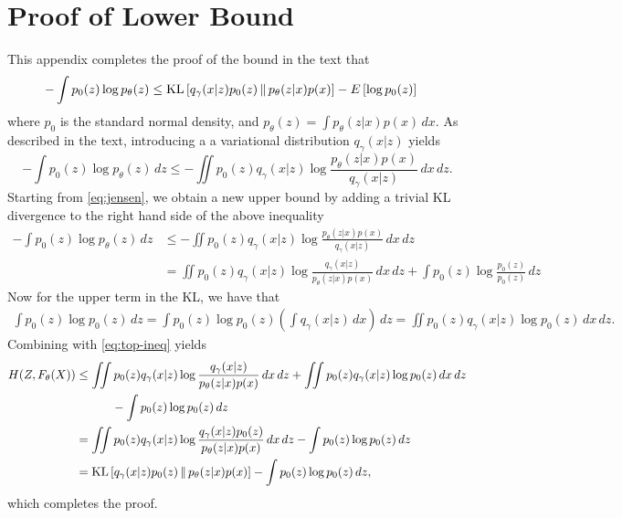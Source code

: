 \appendix
\section{Proof of Lower Bound}

This appendix completes the proof of the bound in the text that
\begin{align}
-\int p_0(z) \log p_\theta(z) 
& \leq \mbox{KL}\left[ q_\gamma(x|z) p_0(z) \,\|\, p_\theta(z|x)p(x) \right]
 - {E}\left[ \log p_0(z) \right]\label{eq:appendix1} 
\end{align}
where $p_0$ is the standard normal density, and $p_\theta(z) = \int p_\theta(z|x) p(x) \,dx$.
As described in the text, introducing a a variational distribution $q_\gamma (x|z)$ yields
\begin{equation}
-\int p_0(z) \log p_\theta(z) \,dz \leq -\iint p_0(z) q_\gamma(x|z) \log \frac{p_\theta(z|x)p(x)}{q_\gamma(x|z)} \,dx \,dz.\label{eq:jensen}
\end{equation}
Starting from \eqref{eq:jensen}, we obtain a new upper bound by adding a trivial KL divergence to the right hand side of the above inequality
\begin{align}
-\int p_0(z) \log p_\theta(z) \,dz
  &\leq -\iint p_0(z) q_\gamma(x|z) \log \frac{p_\theta(z|x)p(x)}{q_\gamma(x|z)} \,dx \,dz \nonumber\\
  &= \iint p_0(z) q_\gamma(x|z) \log \frac{q_\gamma(x|z)}{p_\theta(z|x)p(x)} \,dx \,dz + \int p_0(z) \log \frac{p_0(z)}{p_0(z)} \,dz \label{eq:top-ineq}
\end{align}
Now for the upper term in the KL, we have that
\begin{align*}
	\int p_0(z) \log {p_0(z)} \,dz = \int p_0(z) \log {p_0(z)} \left(\int q_\gamma(x|z) \,dx \right)\,dz 
	 = \iint p_0(z) q_\gamma(x|z) \log {p_0(z)} \,dx \,dz.
\end{align*}
Combining with \eqref{eq:top-ineq} yields
\begin{align} 
H(Z, F_\theta(X)) &\leq \iint p_0(z) q_\gamma(x|z) \log \frac{q_\gamma(x|z)}{p_\theta(z|x)p(x)} \,dx \,dz
        + \iint p_0(z) q_\gamma(x|z) \log {p_0(z)} \,dx \,dz \nonumber\\
        & \qquad\quad - \int p_0(z) \log p_0(z) \,dz \nonumber\\
        &= \iint p_0(z) q_\gamma(x|z) \log \frac{q_\gamma(x|z) p_0(z)}
        {p_\theta(z|x)p(x)} \,dx \,dz
    - \int p_0(z) \log p_0(z) \,dz \nonumber\\
    &=  \mbox{KL}\left[ q_\gamma(x|z) p_0(z) \,\|\, p_\theta(z|x)p(x) \right] - \int p_0(z) \log p_0(z) \,dz, \nonumber
\end{align}	
which completes the proof.



